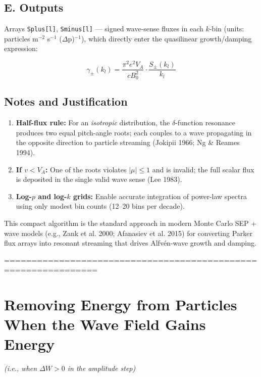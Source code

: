 \subsection*{E. Outputs}

Arrays \texttt{Splus[l]}, \texttt{Sminus[l]} — signed wave-sense fluxes in each $k$-bin  
(units: particles m$^{-2}$ s$^{-1}$ ($\Delta$p)$^{-1}$), which directly enter the quasilinear growth/damping expression:

\[
\gamma_\pm(k_l) = \frac{\pi^2 e^2 V_A}{c B_0^2} \cdot \frac{S_\pm(k_l)}{k_l}
\]

\subsection*{Notes and Justification}

\begin{enumerate}
\item \textbf{Half-flux rule:} For an \emph{isotropic} distribution, the $\delta$-function resonance produces two equal pitch-angle roots; each couples to a wave propagating in the opposite direction to particle streaming (Jokipii 1966; Ng \& Reames 1994).

\item \textbf{If $v < V_A$:} One of the roots violates $|\mu| \leq 1$ and is invalid; the full scalar flux is deposited in the single valid wave sense (Lee 1983).

\item \textbf{Log-$p$ and log-$k$ grids:} Enable accurate integration of power-law spectra using only modest bin counts (12–20 bins per decade).
\end{enumerate}

\medskip

\noindent This compact algorithm is the standard approach in modern Monte Carlo SEP + wave models (e.g., Zank et al. 2000; Afanasiev et al. 2015) for converting Parker flux arrays into resonant streaming that drives Alfvén-wave growth and damping.



===============================================================


\section*{Removing Energy from Particles When the Wave Field Gains Energy}

\noindent
\emph{(i.e., when $\Delta W > 0$ in the amplitude step)}

